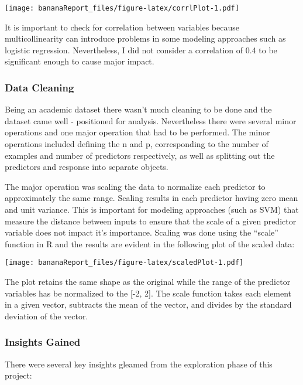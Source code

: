 \documentclass[
]{article}
\begin{document}
\texttt{[image: bananaReport\_files/figure-latex/corrlPlot-1.pdf]}

It is important to check for correlation between variables because
multicollinearity can introduce problems in some modeling approaches
such as logistic regression. Nevertheless, I did not consider a
correlation of 0.4 to be significant enough to cause major impact.

\hypertarget{data-cleaning}{%
\subsubsection{Data Cleaning}\label{data-cleaning}}

Being an academic dataset there wasn't much cleaning to be done and the
dataset came well - positioned for analysis. Nevertheless there were
several minor operations and one major operation that had to be
performed. The minor operations included defining the n and p,
corresponding to the number of examples and number of predictors
respectively, as well as splitting out the predictors and response into
separate objects.

The major operation was scaling the data to normalize each predictor to
approximately the same range. Scaling results in each predictor having
zero mean and unit variance. This is important for modeling approaches
(such as SVM) that measure the distance between inputs to ensure that
the scale of a given predictor variable does not impact it's importance.
Scaling was done using the ``scale'' function in R and the results are
evident in the following plot of the scaled data:

\texttt{[image: bananaReport\_files/figure-latex/scaledPlot-1.pdf]}

The plot retains the same shape as the original while the range of the
predictor variables has be normalized to the {[}-2, 2{]}. The scale
function takes each element in a given vector, subtracts the mean of the
vector, and divides by the standard deviation of the vector.

\hypertarget{insights-gained}{%
\subsubsection{Insights Gained}\label{insights-gained}}

There were several key insights gleamed from the exploration phase of
this project:
\end{document}
